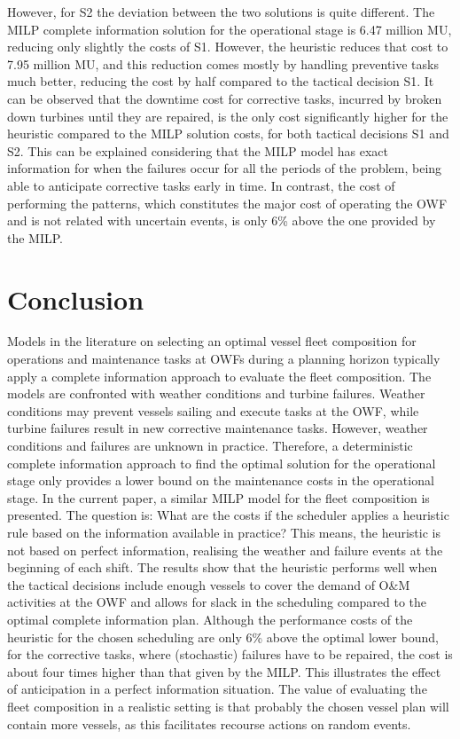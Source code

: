 However, for S2 the deviation between the two solutions is quite different. The MILP complete information solution for the operational stage is 6.47 million MU, reducing only slightly the costs of S1. However, the heuristic reduces that cost to 7.95 million MU, and this reduction comes mostly by handling preventive tasks much better, reducing the cost by half compared to the tactical decision S1. It can be observed that the downtime cost for corrective tasks, incurred by broken down turbines until they are repaired, is the only cost significantly higher for the heuristic compared to the MILP solution costs, for both tactical decisions S1 and S2. This can be explained considering that the MILP model has exact information for when the failures occur for all the periods of the problem, being able to anticipate corrective tasks early in time. In contrast, the cost of performing the patterns, which constitutes the major cost of operating the OWF and is not related with uncertain events, is only  6\% above the one provided by the MILP.





\section{Conclusion}
\label{sec:conclusion}
Models in the literature on selecting an optimal vessel fleet composition for operations and maintenance tasks at OWFs during a planning horizon typically apply a complete information approach to evaluate the fleet composition. The models are confronted with weather conditions and turbine failures. Weather conditions may prevent vessels sailing and execute tasks at the OWF, while turbine failures result in new corrective maintenance tasks. However, weather conditions and failures are unknown in practice. Therefore, a deterministic complete information approach to find the optimal solution for the operational stage only provides a lower bound on the maintenance costs in the operational stage. In the current paper, a similar MILP model for the fleet composition is presented. The question is: What are the costs if the scheduler applies a heuristic rule based on the information available in practice? This means, the heuristic is not based on perfect information, realising the weather and failure events at the beginning of each shift. The results show that the heuristic performs well  when the tactical decisions include enough vessels to cover the demand of O\&M activities at the OWF and allows for slack in the scheduling compared to the optimal complete information plan. Although the performance costs of the heuristic for the chosen scheduling are only 6\% above the optimal lower bound, for the corrective tasks, where (stochastic) failures have to be repaired, the cost is about four times higher than that given by the MILP. This illustrates the effect of anticipation in a perfect information situation. The value of evaluating the fleet composition in a realistic setting is that probably the chosen vessel plan will contain more vessels, as this facilitates recourse actions on random events. 

%
%


%
